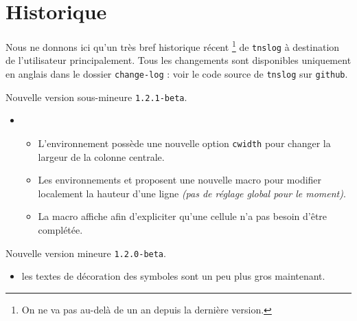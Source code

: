 \documentclass[12pt,a4paper]{article}
\begin{document}
\newpage

\section{Historique}

Nous ne donnons ici qu'un très bref historique récent
\footnote{
	On ne va pas au-delà de un an depuis la dernière version.
}
de \verb+tnslog+ à destination de l'utilisateur principalement.
Tous les changements sont disponibles uniquement en anglais dans le dossier \verb+change-log+ : voir le code source de \verb+tnslog+ sur \verb+github+.

\begin{description}

    \medskip
    \item[2021-03-27] Nouvelle version sous-mineure \verb+1.2.1-beta+.
    
    \begin{itemize}[itemsep=.5em]
        \item {}
        \begin{itemize}[itemsep=.5em]
            \item L'environnement  possède une nouvelle option \verb#cwidth# pour changer la largeur de la colonne centrale.
    
            \item Les environnements  et  proposent une nouvelle macro  pour modifier localement la hauteur d'une ligne \emph{(pas de réglage global pour le moment)}.
            
            \item La macro  affiche \explnothing{} afin d'expliciter qu'une cellule n'a pas besoin d'être complétée.
        \end{itemize}
    \end{itemize}
    
    
    \separation


    \medskip
    \item[2021-03-22] Nouvelle version mineure \verb+1.2.0-beta+.
    
    \begin{itemize}[itemsep=.5em]
        \item {}
              les textes de décoration des symboles sont un peu plus gros maintenant.
    \end{itemize}
    

\end{description}
\end{document}
